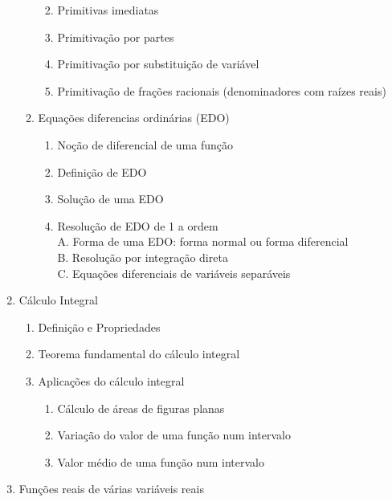 \documentclass[
]{book}
\providecommand{\tightlist}{%
  \setlength{\itemsep}{0pt}\setlength{\parskip}{0pt}}
\begin{document}
\begin{enumerate}
\begin{enumerate}
    \begin{enumerate}
    \def\labelenumiii{\roman{enumiii}.}
    \tightlist
    \item
      Primitivas imediatas\\
    \item
      Primitivação por partes\\
    \item
      Primitivação por substituição de variável\\
    \item
      Primitivação de frações racionais (denominadores com raízes reais)\\
    \end{enumerate}
  \item
    Equações diferencias ordinárias (EDO)

    \begin{enumerate}
    \def\labelenumiii{\roman{enumiii}.}
    \tightlist
    \item
      Noção de diferencial de uma função\\
    \item
      Definição de EDO\\
    \item
      Solução de uma EDO\\
    \item
      Resolução de EDO de 1 a ordem\\
      A. Forma de uma EDO: forma normal ou forma diferencial\\
      B. Resolução por integração direta\\
      C. Equações diferenciais de variáveis separáveis\\
    \end{enumerate}
  \end{enumerate}
\item
  Cálculo Integral

  \begin{enumerate}
  \def\labelenumii{(\alph{enumii})}
  \tightlist
  \item
    Definição e Propriedades\\
  \item
    Teorema fundamental do cálculo integral\\
  \item
    Aplicações do cálculo integral

    \begin{enumerate}
    \def\labelenumiii{\roman{enumiii}.}
    \tightlist
    \item
      Cálculo de áreas de figuras planas\\
    \item
      Variação do valor de uma função num intervalo\\
    \item
      Valor médio de uma função num intervalo\\
    \end{enumerate}
  \end{enumerate}
\item
  Funções reais de várias variáveis reais


\end{enumerate}
\end{document}
